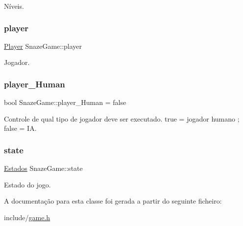 Níveis. 

\mbox{\label{classSnazeGame_a61268a99fe9578f17b7b6565349aa5a9}} 
\subsubsection{\texorpdfstring{player}{player}}
{\footnotesize\ttfamily \hyperlink{classPlayer}{Player} Snaze\+Game\+::player\hspace{0.3cm}{\ttfamily [private]}}



Jogador. 

\mbox{\label{classSnazeGame_accfde443b3ec29be803b24cda85fd4fe}} 
\subsubsection{\texorpdfstring{player\+\_\+\+Human}{player\_Human}}
{\footnotesize\ttfamily bool Snaze\+Game\+::player\+\_\+\+Human = false\hspace{0.3cm}{\ttfamily [private]}}

Controle de qual tipo de jogador deve ser executado. true = jogador humano ; false = IA. \mbox{\label{classSnazeGame_aa0305588eeb6fee59039ba51df01ebc2}} 
\subsubsection{\texorpdfstring{state}{state}}
{\footnotesize\ttfamily \hyperlink{classSnazeGame_a10ea6cb420042fdbfcade4f0261af5c1}{Estados} Snaze\+Game\+::state\hspace{0.3cm}{\ttfamily [private]}}



Estado do jogo. 



A documentação para esta classe foi gerada a partir do seguinte ficheiro\+:\begin{DoxyCompactItemize}
\item 
include/\hyperlink{game_8h}{game.\+h}\end{DoxyCompactItemize}
